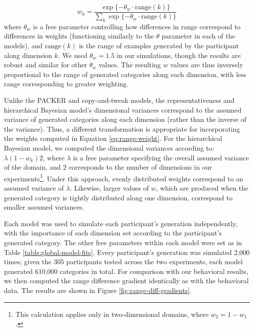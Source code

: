 \documentclass[pdflatex,sn-apa]{sn-jnl}%
\theoremstyle{thmstyleone}%
\theoremstyle{thmstyletwo}%
\theoremstyle{thmstylethree}%
\begin{document}
\begin{equation} w_k = \dfrac {\exp{ \{ -\theta_w \cdot\text{range}(k)} \} } {
\sum_k {\exp{ \{ -\theta_w \cdot\text{range}(k)} \} } }
\label{eq:range-weight}
\end{equation}
% 
where $\theta_w$ is a free parameter controlling how differences in range
correspond to differences in weights (functioning similarly to the $\theta$
parameter in each of the models), and $\text{range}(k)$ is the range of examples
generated by the participant along dimension $k$. We used $\theta_w = 1.5$ in
our simulations, though the results are robust and similar for other $\theta_w$
values. The resulting $w$ values are thus inversely proportional to the range of
generated categories along each dimension, with less range corresponding to
greater weighting.

Unlike the PACKER and copy-and-tweak models, the representativeness and
hierarchical Bayesian model's dimensional variances correspond to the assumed
variance of generated categories along each dimension (rather than the inverse
of the variance). Thus, a different transformation is appropriate for
incorporating the weights computed in Equation \ref{eq:range-weight}. For the
hierarchical Bayesian model, we computed the dimensional variances according to:
$\lambda (1-w_k) 2$, where $\lambda$ is a free parameter specifying the overall
assumed variance of the domain, and $2$ corresponds to the number of dimensions
in our experiments\footnote{This calculation applies only in two-dimensional
  domains, where $w_2 = 1-w_1$.}. Under this approach, evenly distributed
weights correspond to an assumed variance of $\lambda$. Likewise, larger values
of $w$, which are produced when the generated category is tightly distributed
along one dimension, correspond to smaller assumed variances.

Each model was used to simulate each participant's generation independently,
with the importance of each dimension set according to the participant's
generated category. The other free parameters within each model were set as in
Table \ref{table:global-model-fits}. Every participant's generation was
simulated 2,000 times; given the 305 participants tested across the two
experiments, each model generated 610,000 categories in total. For comparison
with our behavioral results, we then computed the range difference gradient
identically as with the behavioral data. The results are shown in Figure
\ref{fig:range-diff-gradients}.
\end{document}
